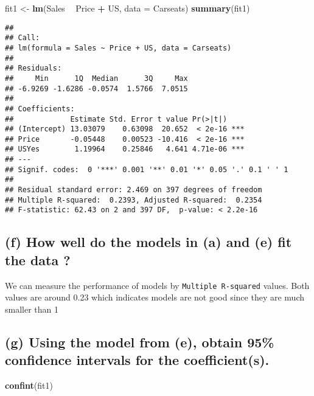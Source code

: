 \documentclass[
]{article}
\newenvironment{Shaded}{\begin{snugshade}}{\end{snugshade}}
\newcommand{\DataTypeTok}[1]{\textcolor[rgb]{0.13,0.29,0.53}{#1}}
\newcommand{\KeywordTok}[1]{\textcolor[rgb]{0.13,0.29,0.53}{\textbf{#1}}}
\newcommand{\NormalTok}[1]{#1}
\newcommand{\OperatorTok}[1]{\textcolor[rgb]{0.81,0.36,0.00}{\textbf{#1}}}
\newcommand{\StringTok}[1]{\textcolor[rgb]{0.31,0.60,0.02}{#1}}
\begin{document}
\begin{Shaded}
\begin{Highlighting}[]
\NormalTok{fit1 <-}\StringTok{ }\KeywordTok{lm}\NormalTok{(Sales }\OperatorTok{~}\StringTok{ }\NormalTok{Price }\OperatorTok{+}\StringTok{ }\NormalTok{US, }\DataTypeTok{data =}\NormalTok{ Carseats)}
\KeywordTok{summary}\NormalTok{(fit1)}
\end{Highlighting}
\end{Shaded}

\begin{verbatim}
## 
## Call:
## lm(formula = Sales ~ Price + US, data = Carseats)
## 
## Residuals:
##     Min      1Q  Median      3Q     Max 
## -6.9269 -1.6286 -0.0574  1.5766  7.0515 
## 
## Coefficients:
##             Estimate Std. Error t value Pr(>|t|)    
## (Intercept) 13.03079    0.63098  20.652  < 2e-16 ***
## Price       -0.05448    0.00523 -10.416  < 2e-16 ***
## USYes        1.19964    0.25846   4.641 4.71e-06 ***
## ---
## Signif. codes:  0 '***' 0.001 '**' 0.01 '*' 0.05 '.' 0.1 ' ' 1
## 
## Residual standard error: 2.469 on 397 degrees of freedom
## Multiple R-squared:  0.2393, Adjusted R-squared:  0.2354 
## F-statistic: 62.43 on 2 and 397 DF,  p-value: < 2.2e-16
\end{verbatim}

\hypertarget{f-how-well-do-the-models-in-a-and-e-fit-the-data}{%
\subsection{(f) How well do the models in (a) and (e) fit the data
?}\label{f-how-well-do-the-models-in-a-and-e-fit-the-data}}

We can measure the performance of models by \texttt{Multiple\ R-squared}
values. Both values are around 0.23 which indicates models are not good
since they are much smaller than 1

\hypertarget{g-using-the-model-from-e-obtain-95-confidence-intervals-for-the-coefficients.}{%
\subsection{(g) Using the model from (e), obtain 95\% confidence
intervals for the
coefficient(s).}\label{g-using-the-model-from-e-obtain-95-confidence-intervals-for-the-coefficients.}}

\begin{Shaded}
\begin{Highlighting}[]
\KeywordTok{confint}\NormalTok{(fit1)}
\end{Highlighting}
\end{Shaded}
\end{document}
